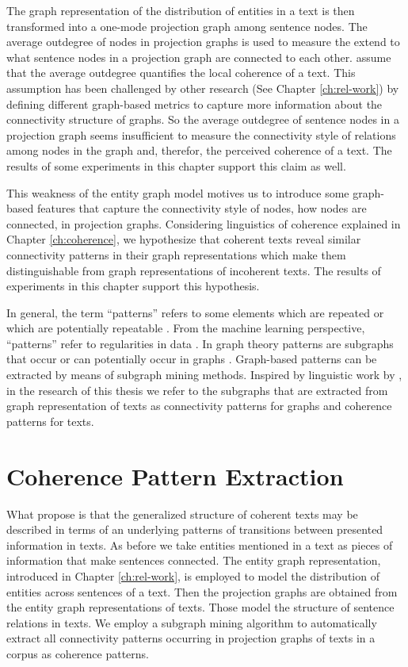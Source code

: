 The graph representation of the distribution of entities in a text is then transformed into a one-mode projection graph among sentence nodes. 
The average outdegree of nodes in projection graphs is used to measure the extend to what sentence nodes in a projection graph are connected to each other. 
 assume that the average outdegree quantifies the local coherence of a text. 
This assumption has been challenged by other research (See Chapter \ref{ch:rel-work}) by defining different graph-based metrics to capture more information about the connectivity structure of graphs. 
So the average outdegree of sentence nodes in a projection graph seems insufficient to measure the connectivity style of relations among nodes in the graph and, therefor, the perceived coherence of a text. 
The results of some experiments in this chapter support this claim as well. 

This weakness of the entity graph model motives us to introduce some graph-based features that capture the connectivity style of nodes, how nodes are connected, in projection graphs. 
Considering linguistics of coherence explained in Chapter \ref{ch:coherence}, we hypothesize that  coherent texts reveal similar connectivity patterns in their graph representations which make them distinguishable from graph representations of incoherent texts. 
The results of experiments in this chapter support this hypothesis. 

In general, the term ``patterns'' refers to some elements which are repeated or which are potentially repeatable \cite{}. 
From the machine learning perspective, ``patterns'' refer to regularities in data \cite{bishop06}.     
In graph theory patterns are subgraphs that occur or can potentially occur in graphs \cite{}. 
Graph-based patterns can be extracted by means of subgraph mining methods. 
Inspired by linguistic work by , in the research of this thesis we refer to the  subgraphs that are extracted from graph representation of texts as connectivity patterns for graphs and coherence patterns for texts.  


\section{Coherence Pattern Extraction}
\label{sec:pattern-extraction}

What  propose is that the generalized structure of coherent texts may be described in terms of an underlying patterns of transitions between presented information in texts.  
As before we take entities mentioned in a text as pieces of information that make sentences connected. 
The entity graph representation, introduced in Chapter \ref{ch:rel-work}, is employed to model the distribution of entities across sentences of a text. 
Then the projection graphs are obtained from the entity graph representations of texts. 
Those model the structure of sentence relations in texts. 
We employ a subgraph mining algorithm to automatically extract all connectivity patterns occurring in projection graphs of texts in a corpus as coherence patterns.   

